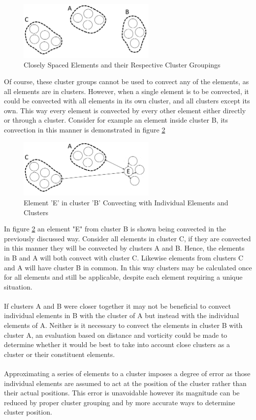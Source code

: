 \begin{figure}[H]
\centering
\includegraphics[width=0.6\textwidth]{Figures/ThreeClusters_Example.png}
\caption{\label{fig:ThreeClusters}Closely Spaced Elements and their Respective Cluster Groupings}
\end{figure}

Of course, these cluster groups cannot be used to convect any of the elements, as all elements are in clusters. However, when a single element is to be convected, it could be convected with all elements in its own cluster, and all clusters except its own. This way every element is convected by every other element either directly or through a cluster. Consider for example an element inside cluster B, its convection in this manner is demonstrated in figure \ref{fig:EinB}

\begin{figure}[H]
\centering
\includegraphics[width=0.6\textwidth]{Figures/ElementInB.png}
\caption{\label{fig:EinB}Element 'E' in cluster 'B' Convecting with Individual Elements and Clusters}
\end{figure}

In figure \ref{fig:EinB} an element "E" from cluster B is shown being convected in the previously discussed way. Consider all elements in cluster C, if they are convected in this manner they will be convected by clusters A and B. Hence, the elements in B and A will both convect with cluster C. Likewise elements from clusters C and A will have cluster B in common. In this way clusters may be calculated once for all elements and still be applicable, despite each element requiring a unique situation.
\\\\
If clusters A and B were closer together it may not be beneficial to convect individual elements in B with the cluster of A but instead with the individual elements of A. Neither is it necessary to convect the elements in cluster B with cluster A, an evaluation based on distance and vorticity could be made to determine whether it would be best to take into account close clusters as a cluster or their constituent elements.
\\\\
Approximating a series of elements to a cluster imposes a degree of error as those individual elements are assumed to act at the position of the cluster rather than their actual positions. This error is unavoidable however its magnitude can be reduced by proper cluster grouping and by more accurate ways to determine cluster position.

